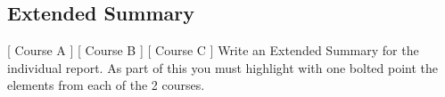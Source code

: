 \subsection*{Extended Summary}
[ Course A ] [ Course B ] [ Course C ] 
\newline
Write an Extended Summary for the individual report.
As part of this you must highlight with one bolted point the elements from each of the 2 courses.